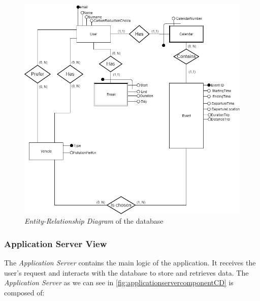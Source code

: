 \begin{figure}
	\includegraphics[width = \textwidth, keepaspectratio = true]{Img/ERDiagram}
	\caption{\emph{Entity-Relationship Diagram} of the database}
	\label{fig:ERDiagram}
\end{figure}

\subsubsection{Application Server View}
The \emph{Application Server} contains the main logic of the application. It receives the user's request and interacts with the database to store and retrieves data. 
The \emph{Application Server} as we can see in \autoref{fig:applicationservercomponentCD} is composed of:

